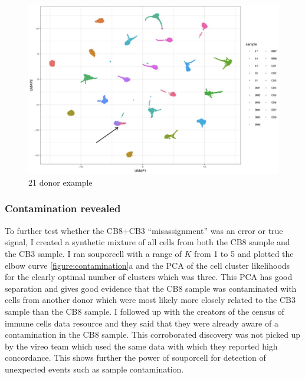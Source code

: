\begin{figure}[htbp!]
\caption{21 donor example}
\label{figure:21donor}
\begin{centering}

\includegraphics[width=\textwidth]{21donor.png} 
\end{centering}


\end{figure}

\subsubsection{Contamination revealed}

\par{
To further test whether the CB8+CB3 ``misassignment'' was an error or true signal, I created a synthetic mixture of all cells from both the CB8 sample and the CB3 sample. I ran souporcell with a range of $K$ from 1 to 5 and plotted the elbow curve \ref{figure:contamination}a and the PCA of the cell cluster likelihoods for the clearly optimal number of clusters which was three. This PCA has good separation and gives good evidence that the CB8 sample was contaminated with cells from another donor which were most likely more closely related to the CB3 sample than the CB8 sample. I followed up with the creators of the census of immune cells data resource and they said that they were already aware of a contamination in the CB8 sample. This corroborated discovery was not picked up by the vireo team which used the same data with which they reported high concordance. This shows further the power of souporcell for detection of unexpected events such as sample contamination.
}

